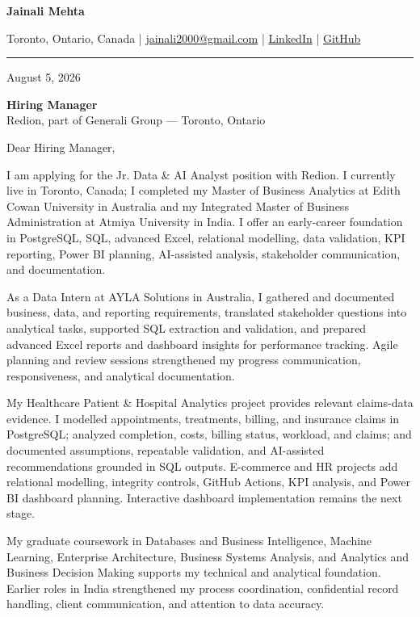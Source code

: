 \documentclass[letterpaper,10pt]{article}
\begin{document}
\begin{center}
  {\fontsize{17}{19}\selectfont\textbf{Jainali Mehta}}\par\vspace{2pt}
  \small Toronto, Ontario, Canada \;|\;
  \href{mailto:jainali2000@gmail.com}{jainali2000@gmail.com} \;|\;
  \href{https://www.linkedin.com/in/jainali-mehta}{LinkedIn} \;|\;
  \href{https://github.com/jainalimehta}{GitHub}
\end{center}
\vspace{-5pt}
\noindent\rule{\textwidth}{0.4pt}

August 5, 2026

\textbf{Hiring Manager}\\
Redion, part of Generali Group --- Toronto, Ontario

Dear Hiring Manager,

I am applying for the Jr. Data \& AI Analyst position with Redion. I currently live in Toronto, Canada; I completed my Master of Business Analytics at Edith Cowan University in Australia and my Integrated Master of Business Administration at Atmiya University in India. I offer an early-career foundation in PostgreSQL, SQL, advanced Excel, relational modelling, data validation, KPI reporting, Power BI planning, AI-assisted analysis, stakeholder communication, and documentation.

As a Data Intern at AYLA Solutions in Australia, I gathered and documented business, data, and reporting requirements, translated stakeholder questions into analytical tasks, supported SQL extraction and validation, and prepared advanced Excel reports and dashboard insights for performance tracking. Agile planning and review sessions strengthened my progress communication, responsiveness, and analytical documentation.

My Healthcare Patient \& Hospital Analytics project provides relevant claims-data evidence. I modelled appointments, treatments, billing, and insurance claims in PostgreSQL; analyzed completion, costs, billing status, workload, and claims; and documented assumptions, repeatable validation, and AI-assisted recommendations grounded in SQL outputs. E-commerce and HR projects add relational modelling, integrity controls, GitHub Actions, KPI analysis, and Power BI dashboard planning. Interactive dashboard implementation remains the next stage.

My graduate coursework in Databases and Business Intelligence, Machine Learning, Enterprise Architecture, Business Systems Analysis, and Analytics and Business Decision Making supports my technical and analytical foundation. Earlier roles in India strengthened my process coordination, confidential record handling, client communication, and attention to data accuracy.
\end{document}
